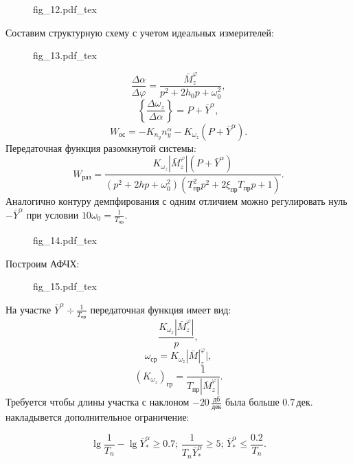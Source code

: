 \documentclass{article}
\begin{document}
\begin{figure}[H]
\centering
{fig_12.pdf_tex}
\end{figure}
Составим структурную схему с учетом идеальных измерителей:
\begin{figure}[H]
\centering
{fig_13.pdf_tex}
\end{figure}
\[
\frac{\Delta \alpha}{\Delta \varphi} = \frac{\bar{M}_z^\varphi}{p^2 + 2 h_0 p + \omega_0^2},
\]
\[
\left\{ \frac{\Delta \omega_z}{\Delta \alpha}\right\} = P + \bar{Y}^\alpha,
\]
\[
W_{ос} = -K_{n_y} n_y^\alpha - K_{\omega_z} (P + \bar{Y}^\alpha).
\]
Передаточная функция разомкнутой системы:
\[
W_{раз} = \frac{K_{\omega_z} |\bar{M}_z^{\varphi}|(P + \bar{Y}^\alpha)}{(p^2 + 2h p + \omega_0^2)(T_{пр}^2 p^2 + 2 \xi_{пр} T_{пр} p + 1)}.
\]
Аналогично контуру демпфирования с одним отличием можно регулировать нуль $-\bar{Y}^\alpha$ при условии $10 \omega_0 = \frac{1}{T_{пр}}$.
\begin{figure}[H]
\centering
{fig_14.pdf_tex}
\end{figure}
Построим АФЧХ:
\begin{figure}[H]
\centering
{fig_15.pdf_tex}
\end{figure}
На участке $\bar{Y}^\alpha \div \frac{1}{T_{пр}}$ передаточная функция имеет вид:
\[
\frac{K_{\omega_z}|\bar{M}_z^\varphi|}{p},
\]
\[
\omega_{ср} = K_{\omega_z} |\bar{M}|_z^\varphi|,
\]
\[
(K_{\omega_z})_{гр} = \frac{1}{T_{пр} |\bar{M}_z^\varphi|}.
\]
Требуется чтобы длины участка с наклоном $-20 \, \frac{дб}{дек}$ была больше $0.7 \, дек.$ накладывется дополнительное ограничение:

\[
\lg \frac{1}{T_n} - \lg \bar{Y}^{\alpha}_* \geq 0.7;\, \frac{1}{T_n \bar{Y}^{\alpha}_*} \geq 5; \, \bar{Y}^{\alpha}_* \leq \frac{0.2}{T_n}.
\] 
\end{document}
